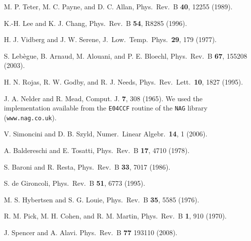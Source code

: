 \documentclass[twocolumn,prb,showpacs,superscriptaddress]{revtex4}
\begin{document}
\begin{thebibliography}{99}
M. P. Teter, M. C. Payne, and D. C. Allan,
Phys.\ Rev.\ B {\bf 40}, 12255 (1989).

K.-H. Lee and K. J. Chang,
Phys.\ Rev.\ B {\bf 54}, R8285 (1996).

H. J. Vidberg and J. W. Serene,
J.\ Low.\ Temp.\ Phys.\ {\bf 29}, 179 (1977).

S. Leb\`egue, B. Arnaud, M. Alouani, and P. E. Bloechl,
Phys.\ Rev.\ B {\bf 67}, 155208 (2003).

H. N. Rojas, R. W. Godby, and R. J. Needs,
Phys.\ Rev.\ Lett.\ {\bf 10}, 1827 (1995).

J. A. Nelder and R. Mead, 
Comput. J. {\bf 7}, 308 (1965).
We used the implementation available from the
{\tt E04CCF} routine of the {\tt NAG} library
({\tt www.nag.co.uk}).

V. Simoncini and D. B. Szyld,
Numer.\ Linear Algebr.\ {\bf 14}, 1 (2006).

A. Baldereschi and E. Tosatti,
Phys.\ Rev.\ B {\bf 17}, 4710 (1978).

S. Baroni and R. Resta,
Phys.\ Rev.\ B {\bf 33}, 7017 (1986).

S. de Gironcoli,
Phys.\ Rev.\ B {\bf 51}, 6773 (1995).

M. S. Hybertsen and S. G. Louie,
Phys.\ Rev.\ B {\bf 35}, 5585 (1976).

R. M. Pick, M. H. Cohen, and R. M. Martin,
Phys.\ Rev.\ B {\bf 1}, 910 (1970). 

J. Spencer and A. Alavi.
Phys.\ Rev.\ B {\bf 77} 193110 (2008).

\end{thebibliography}
\end{document}
